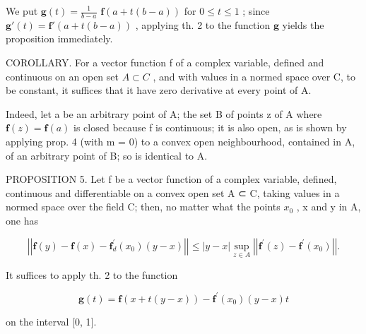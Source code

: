 We put \(\mathbf{g}(t) = \frac{1}{b - a}\) \(\mathbf{f}(a + t(b - a))\) for \(0 \leqslant t \leqslant 1\) ; since \(\mathbf{g}'(t) = \mathbf{f}'(a + t(b - a))\) , applying th. 2 to the function \(\mathbf{g}\) yields the proposition immediately.

COROLLARY. For a vector function f of a complex variable, defined and continuous on an open set \(A \subset C\) , and with values in a normed space over C, to be constant, it suffices that it have zero derivative at every point of A.

Indeed, let a be an arbitrary point of A; the set B of points z of A where \(\mathbf{f}(z) = \mathbf{f}(a)\) is closed because f is continuous; it is also open, as is shown by applying prop. 4 (with m = 0) to a convex open neighbourhood, contained in A, of an arbitrary point of B; so is identical to A.

PROPOSITION 5. Let f be a vector function of a complex variable, defined, continuous and differentiable on a convex open set A ⊂ C, taking values in a normed space over the field C; then, no matter what the points \(x_{0}\) , x and y in A, one has

\[
\left| \left| \mathbf {f} (y) - \mathbf {f} (x) - \mathbf {f} _ {d} ^ {\prime} (x _ {0}) (y - x) \right| \right| \leqslant | y - x | \sup _ {z \in A} \left| \left| \mathbf {f} ^ {\prime} (z) - \mathbf {f} ^ {\prime} (x _ {0}) \right| \right|.\tag{10}
\]

It suffices to apply th. 2 to the function

\[
\mathbf {g} (t) = \mathbf {f} (x + t (y - x)) - \mathbf {f} ^ {\prime} (x _ {0}) (y - x) t
\]

on the interval {[}0, 1{]}.


